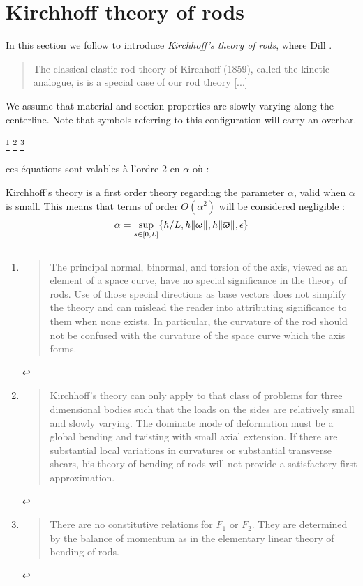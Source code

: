 \clearpage
\section{Kirchhoff theory of rods}

In this section we follow \cite{Dill1992} to introduce \emph{Kirchhoff's theory of rods}, where Dill . \blockcquote[p.~238]{Antman2005}{The classical elastic rod theory of Kirchhoff (1859), called the kinetic analogue, is is a special case of our rod theory [...]}

We assume that material and section properties are slowly varying along the centerline.
Note that symbols referring to this configuration will carry an overbar.

\footnote{\blockcquote[p.~5]{Dill1992}{The principal normal, binormal, and torsion of the axis, viewed as an element of a space curve, have no special significance in the theory of rods. Use of those special directions as base vectors does not simplify the theory and can mislead the reader into attributing significance to them when none exists. In particular, the curvature of the rod should not be confused with the curvature of the space curve which the axis forms.}}
\footnote{\blockcquote[p.~18]{Dill1992}{Kirchhoff's theory can only apply to that class of problems for three dimensional bodies such that the loads on the sides are relatively small and slowly varying. The dominate mode of deformation must be a global bending and twisting with small axial extension. If there are substantial local variations in curvatures or substantial transverse shears, his theory of bending of rods will not provide a satisfactory first approximation.}}
\footnote{\blockcquote[p.~15]{Dill1992}{There are no constitutive relations for $F_1$ or $F_2$. They are determined by the balance of momentum as in the elementary linear theory of bending of rods.}}

ces équations sont valables à l'ordre 2 en $\alpha$ \cite{Coleman1993} où :

Kirchhoff's theory is a first order theory regarding the parameter $\alpha$, valid when $\alpha$ is small. This means that terms of order $O(\alpha^2)$ will be considered negligible
 :
\begin{equation}
	\alpha = \sup_{s \in [0,L]} \{ h/L, h \norm{\vect{\omega}}, h\norm{\overbar{\vect{\omega}}}, \epsilon \}
\end{equation}

